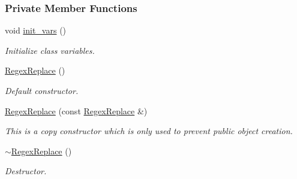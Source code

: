 \subsubsection*{Private Member Functions}
\begin{DoxyCompactItemize}
\item 
void \hyperlink{classjpcre2_1_1RegexReplace_a462810e8fc902f09e475a164e81cc5f5}{init\+\_\+vars} ()\hypertarget{classjpcre2_1_1RegexReplace_a462810e8fc902f09e475a164e81cc5f5}{}\label{classjpcre2_1_1RegexReplace_a462810e8fc902f09e475a164e81cc5f5}

\begin{DoxyCompactList}\small\item\em Initialize class variables. \end{DoxyCompactList}\item 
\hyperlink{classjpcre2_1_1RegexReplace_ac50687b874800c827a6fa623b9b35753}{Regex\+Replace} ()
\begin{DoxyCompactList}\small\item\em Default constructor. \end{DoxyCompactList}\item 
\hyperlink{classjpcre2_1_1RegexReplace_a257d326d57af9ccbc7a45b002c34ed0a}{Regex\+Replace} (const \hyperlink{classjpcre2_1_1RegexReplace}{Regex\+Replace} \&)
\begin{DoxyCompactList}\small\item\em This is a copy constructor which is only used to prevent public object creation. \end{DoxyCompactList}\item 
\hyperlink{classjpcre2_1_1RegexReplace_ab27102839e7ff0914bcd204d750097ac}{$\sim$\+Regex\+Replace} ()
\begin{DoxyCompactList}\small\item\em Destructor. \end{DoxyCompactList}\end{DoxyCompactItemize}
